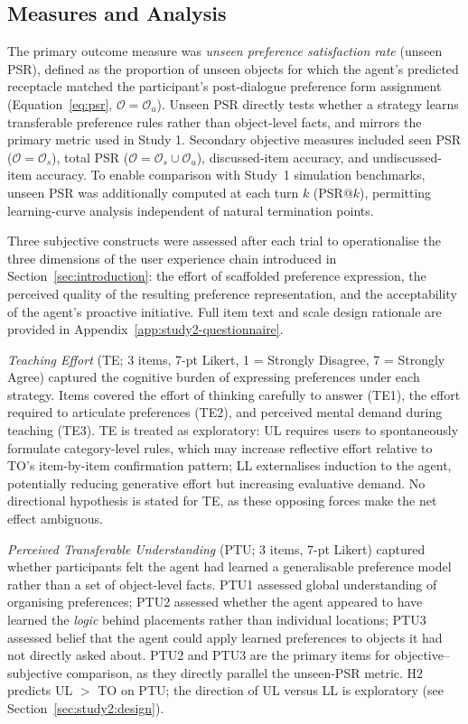 \documentclass[manuscript,review,anonymous]{acmart}
\begin{document}
\subsection{Measures and Analysis}
\label{sec:study2:measures}

The primary outcome measure was \textit{unseen preference satisfaction rate} (unseen PSR), defined as the proportion of unseen objects for which the agent's predicted receptacle matched the participant's post-dialogue preference form assignment (Equation~\ref{eq:psr}, $\mathcal{O} = \mathcal{O}_u$). Unseen PSR directly tests whether a strategy learns transferable preference rules rather than object-level facts, and mirrors the primary metric used in Study 1. Secondary objective measures included seen PSR ($\mathcal{O} = \mathcal{O}_s$), total PSR ($\mathcal{O} = \mathcal{O}_s \cup \mathcal{O}_u$), discussed-item accuracy, and undiscussed-item accuracy. To enable comparison with Study~1 simulation benchmarks, unseen PSR was additionally computed at each turn $k$ (PSR@$k$), permitting learning-curve analysis independent of natural termination points.

Three subjective constructs were assessed after each trial to operationalise the three dimensions of the user experience chain introduced in Section~\ref{sec:introduction}: the effort of scaffolded preference expression, the perceived quality of the resulting preference representation, and the acceptability of the agent's proactive initiative. Full item text and scale design rationale are provided in Appendix~\ref{app:study2-questionnaire}.

\textit{Teaching Effort} (TE; 3 items, 7-pt Likert, 1 = Strongly Disagree, 7 = Strongly Agree) captured the cognitive burden of expressing preferences under each strategy. Items covered the effort of thinking carefully to answer (TE1), the effort required to articulate preferences (TE2), and perceived mental demand during teaching (TE3). TE is treated as exploratory: UL requires users to spontaneously formulate category-level rules, which may increase reflective effort relative to TO's item-by-item confirmation pattern; LL externalises induction to the agent, potentially reducing generative effort but increasing evaluative demand. No directional hypothesis is stated for TE, as these opposing forces make the net effect ambiguous.

\textit{Perceived Transferable Understanding} (PTU; 3 items, 7-pt Likert) captured whether participants felt the agent had learned a generalisable preference model rather than a set of object-level facts. PTU1 assessed global understanding of organising preferences; PTU2 assessed whether the agent appeared to have learned the \textit{logic} behind placements rather than individual locations; PTU3 assessed belief that the agent could apply learned preferences to objects it had not directly asked about. PTU2 and PTU3 are the primary items for objective--subjective comparison, as they directly parallel the unseen-PSR metric. H2 predicts UL $>$ TO on PTU; the direction of UL versus LL is exploratory (see Section~\ref{sec:study2:design}).
\end{document}
